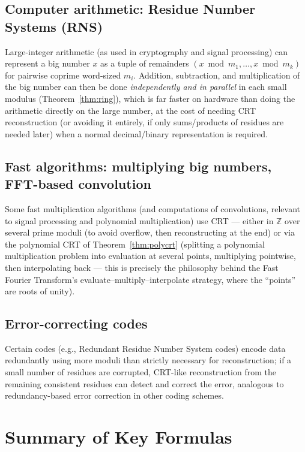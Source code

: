 \documentclass[11pt]{article}
\theoremstyle{definition}
\theoremstyle{remark}
\newcommand{\Z}{\mathbb{Z}}
\begin{document}
\subsection{Computer arithmetic: Residue Number Systems (RNS)}
Large-integer arithmetic (as used in cryptography and signal processing) can represent a big number $x$ as a tuple of remainders $(x\bmod m_1,\dots,x\bmod m_k)$ for pairwise coprime word-sized $m_i$. Addition, subtraction, and multiplication of the big number can then be done \emph{independently and in parallel} in each small modulus (Theorem~\ref{thm:ring}), which is far faster on hardware than doing the arithmetic directly on the large number, at the cost of needing CRT reconstruction (or avoiding it entirely, if only sums/products of residues are needed later) when a normal decimal/binary representation is required.

\subsection{Fast algorithms: multiplying big numbers, FFT-based convolution}
Some fast multiplication algorithms (and computations of convolutions, relevant to signal processing and polynomial multiplication) use CRT — either in $\Z$ over several prime moduli (to avoid overflow, then reconstructing at the end) or via the polynomial CRT of Theorem~\ref{thm:polycrt} (splitting a polynomial multiplication problem into evaluation at several points, multiplying pointwise, then interpolating back — this is precisely the philosophy behind the Fast Fourier Transform's evaluate–multiply–interpolate strategy, where the ``points'' are roots of unity).

\subsection{Error-correcting codes}
Certain codes (e.g., Redundant Residue Number System codes) encode data redundantly using more moduli than strictly necessary for reconstruction; if a small number of residues are corrupted, CRT-like reconstruction from the remaining consistent residues can detect and correct the error, analogous to redundancy-based error correction in other coding schemes.

\section{Summary of Key Formulas}
\end{document}
